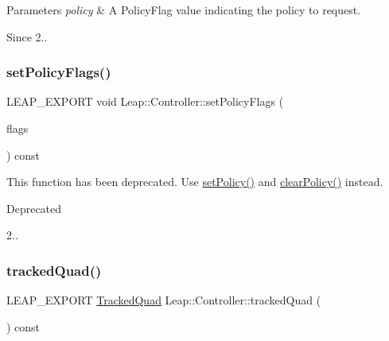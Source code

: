 \begin{DoxyParams}{Parameters}
{\em policy} & A Policy\+Flag value indicating the policy to request. \\
\hline
\end{DoxyParams}
\begin{DoxySince}{Since}
2.. 
\end{DoxySince}
\mbox{\label{class_leap_1_1_controller_a39499e27cca45521f1f8c4d7bbd66adf}} 
\subsubsection{\texorpdfstring{set\+Policy\+Flags()}{setPolicyFlags()}}
{\footnotesize\ttfamily L\+E\+A\+P\+\_\+\+E\+X\+P\+O\+RT void Leap\+::\+Controller\+::set\+Policy\+Flags (\begin{DoxyParamCaption}\item[{\hyperlink{class_leap_1_1_controller_a0bdb49fa94aa2da8b098c1ac296528d6}{Policy\+Flag}}]{flags }\end{DoxyParamCaption}) const}

This function has been deprecated. Use \hyperlink{class_leap_1_1_controller_a5854109f9466b9b2b4638592450160a9}{set\+Policy()} and \hyperlink{class_leap_1_1_controller_a8640acf31dfcb70a86329f79f0a9efc0}{clear\+Policy()} instead. \begin{DoxyRefDesc}{Deprecated}
\item[\hyperlink{deprecated__deprecated000005}{Deprecated}]2.. \end{DoxyRefDesc}
\mbox{\label{class_leap_1_1_controller_a2ca6b445093ec79dedc767111bd00a74}} 
\subsubsection{\texorpdfstring{tracked\+Quad()}{trackedQuad()}}
{\footnotesize\ttfamily L\+E\+A\+P\+\_\+\+E\+X\+P\+O\+RT \hyperlink{class_leap_1_1_tracked_quad}{Tracked\+Quad} Leap\+::\+Controller\+::tracked\+Quad (\begin{DoxyParamCaption}{ }\end{DoxyParamCaption}) const}

